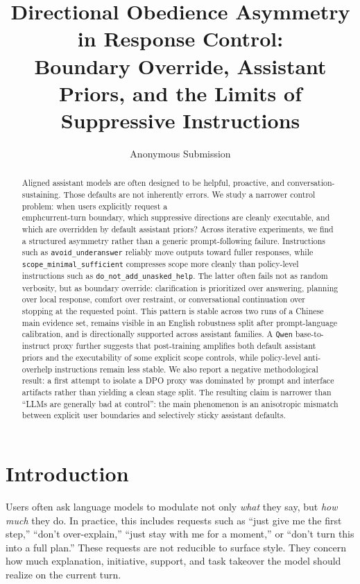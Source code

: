 \documentclass[11pt]{article}
\title{Directional Obedience Asymmetry in Response Control:\\
Boundary Override, Assistant Priors, and the Limits of Suppressive Instructions}
\author{Anonymous Submission}
\date{}
\begin{document}
\setlength{\emergencystretch}{3em}
\setlength{\tabcolsep}{5pt}
\renewcommand{\arraystretch}{1.08}
\maketitle

\begin{abstract}
Aligned assistant models are often designed to be helpful, proactive, and conversation-sustaining. Those defaults are not inherently errors. We study a narrower control problem: when users explicitly request a \\emph{current-turn boundary}, which suppressive directions are cleanly executable, and which are overridden by default assistant priors? Across iterative experiments, we find a structured asymmetry rather than a generic prompt-following failure. Instructions such as \texttt{avoid\_underanswer} reliably move outputs toward fuller responses, while \texttt{scope\_minimal\_sufficient} compresses scope more cleanly than policy-level instructions such as \texttt{do\_not\_add\_unasked\_help}. The latter often fails not as random verbosity, but as boundary override: clarification is prioritized over answering, planning over local response, comfort over restraint, or conversational continuation over stopping at the requested point. This pattern is stable across two runs of a Chinese main evidence set, remains visible in an English robustness split after prompt-language calibration, and is directionally supported across assistant families. A \texttt{Qwen} base-to-instruct proxy further suggests that post-training amplifies both default assistant priors and the executability of some explicit scope controls, while policy-level anti-overhelp instructions remain less stable. We also report a negative methodological result: a first attempt to isolate a DPO proxy was dominated by prompt and interface artifacts rather than yielding a clean stage split. The resulting claim is narrower than ``LLMs are generally bad at control'': the main phenomenon is an anisotropic mismatch between explicit user boundaries and selectively sticky assistant defaults.
\end{abstract}

\section{Introduction}
Users often ask language models to modulate not only \emph{what} they say, but \emph{how much} they do. In practice, this includes requests such as ``just give me the first step,'' ``don't over-explain,'' ``just stay with me for a moment,'' or ``don't turn this into a full plan.'' These requests are not reducible to surface style. They concern how much explanation, initiative, support, and task takeover the model should realize on the current turn.
\end{document}
